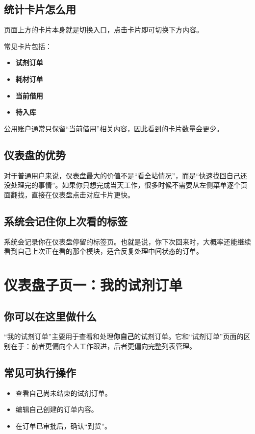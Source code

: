 \documentclass[12pt,a4paper]{ctexart}
\begin{document}
\subsection{统计卡片怎么用}
页面上方的卡片本身就是切换入口，点击卡片即可切换下方内容。

常见卡片包括：
\begin{itemize}
  \item \textbf{试剂订单}
  \item \textbf{耗材订单}
  \item \textbf{当前借用}
  \item \textbf{待入库}
\end{itemize}

公用账户通常只保留“当前借用”相关内容，因此看到的卡片数量会更少。

\subsection{仪表盘的优势}
对于普通用户来说，仪表盘最大的价值不是“看全站情况”，而是“快速找回自己还没处理完的事情”。如果你只想完成当天工作，很多时候不需要从左侧菜单逐个页面翻找，直接在仪表盘点击对应卡片更快。

\subsection{系统会记住你上次看的标签}
系统会记录你在仪表盘停留的标签页。也就是说，你下次回来时，大概率还能继续看到自己上次正在看的那个模块，适合反复处理中间状态的订单。

\newpage
\section{仪表盘子页一：我的试剂订单}

\subsection{你可以在这里做什么}
“我的试剂订单”主要用于查看和处理\textbf{你自己}的试剂订单。它和“试剂订单”页面的区别在于：前者更偏向个人工作跟进，后者更偏向完整列表管理。

\subsection{常见可执行操作}
\begin{itemize}
  \item 查看自己尚未结束的试剂订单。
  \item 编辑自己创建的订单内容。
  \item 在订单已审批后，确认“到货”。
\end{itemize}
\end{document}
